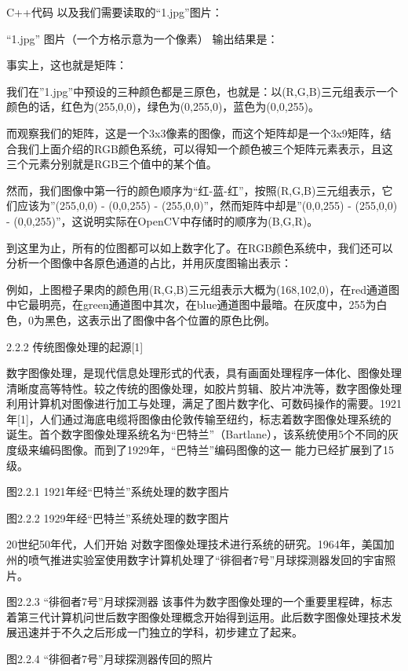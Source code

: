 C++代码
	以及我们需要读取的“1.jpg”图片：

“1.jpg” 图片（一个方格示意为一个像素）
	输出结果是：




	事实上，这也就是矩阵：

	我们在”1.jpg”中预设的三种颜色都是三原色，也就是：以(R,G,B)三元组表示一个颜色的话，红色为(255,0,0)，绿色为(0,255,0)，蓝色为(0,0,255)。

	而观察我们的矩阵，这是一个3x3像素的图像，而这个矩阵却是一个3x9矩阵，结合我们上面介绍的RGB颜色系统，可以得知一个颜色被三个矩阵元素表示，且这三个元素分别就是RGB三个值中的某个值。

	然而，我们图像中第一行的颜色顺序为“红-蓝-红”，按照(R,G,B)三元组表示，它们应该为”(255,0,0) - (0,0,255) - (255,0,0)”，然而矩阵中却是”(0,0,255) - (255,0,0) - (0,0,255)”，这说明实际在OpenCV中存储时的顺序为(B,G,R)。

	到这里为止，所有的位图都可以如上数字化了。在RGB颜色系统中，我们还可以分析一个图像中各原色通道的占比，并用灰度图输出表示：

	例如，上图橙子果肉的颜色用(R,G,B)三元组表示大概为(168,102,0)，在red通道图中它最明亮，在green通道图中其次，在blue通道图中最暗。在灰度中，255为白色，0为黑色，这表示出了图像中各个位置的原色比例。

2.2.2 传统图像处理的起源[1]

	数字图像处理，是现代信息处理形式的代表，具有画面处理程序一体化、图像处理清晰度高等特性。较之传统的图像处理，如胶片剪辑、胶片冲洗等，数字图像处理利用计算机对图像进行加工与处理，满足了图片数字化、可数码操作的需要。1921年[1]，人们通过海底电缆将图像由伦敦传输至纽约，标志着数字图像处理系统的诞生。首个数字图像处理系统名为“巴特兰”（Bartlane），该系统使用5个不同的灰度级来编码图像。而到了1929年，“巴特兰”编码图像的这一 能力已经扩展到了15级。

图2.2.1 1921年经“巴特兰”系统处理的数字图片

图2.2.2 1929年经“巴特兰”系统处理的数字图片

20世纪50年代，人们开始 对数字图像处理技术进行系统的研究。1964年，美国加州的喷气推进实验室使用数字计算机处理了“徘徊者7号”月球探测器发回的宇宙照片。

图2.2.3 “徘徊者7号”月球探测器
该事件为数字图像处理的一个重要里程碑，标志着第三代计算机问世后数字图像处理概念开始得到运用。此后数字图像处理技术发展迅速并于不久之后形成一门独立的学科，初步建立了起来。

图2.2.4 “徘徊者7号”月球探测器传回的照片

